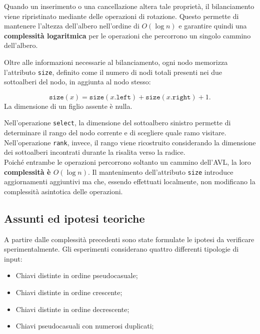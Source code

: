 \documentclass[a4paper,11pt]{article}
\begin{document}
Quando un inserimento o una cancellazione altera tale proprietà, il bilanciamento viene ripristinato mediante delle operazioni di rotazione. Questo permette di mantenere l'altezza dell'albero nell'ordine di \textbf{$O(\log n)$} e garantire quindi una \textbf{complessità logaritmica} per le operazioni che percorrono un singolo cammino dell'albero.

Oltre alle informazioni necessarie al bilanciamento, ogni nodo memorizza l'attributo \texttt{size}, definito come il numero di nodi totali presenti nei due sottoalberi del nodo, in aggiunta al nodo stesso:

\[
    \texttt{size}(x)
    =
    \texttt{size}(x.\texttt{left})
    +
    \texttt{size}(x.\texttt{right})
    + 1.
\]
La dimensione di un figlio assente è nulla.  

Nell'operazione \texttt{select}, la dimensione del sottoalbero sinistro permette di determinare il rango del nodo corrente e di scegliere quale ramo visitare. Nell'operazione \texttt{rank}, invece, il rango viene ricostruito considerando la dimensione dei sottoalberi incontrati durante la risalita verso la radice.\\
Poiché entrambe le operazioni percorrono soltanto un cammino dell'AVL, la loro \textbf{complessità è {$O(\log n)$}}. Il mantenimento dell'attributo \texttt{size} introduce aggiornamenti aggiuntivi ma che, essendo effettuati localmente, non modificano la complessità asintotica delle operazioni.


\subsection{Assunti ed ipotesi teoriche}
A partire dalle complessità precedenti sono state formulate le ipotesi da verificare sperimentalmente. Gli esperimenti considerano quattro differenti tipologie di input: 
\begin{itemize}
    \item Chiavi distinte in ordine pseudocasuale;
    
    \item Chiavi distinte in ordine crescente;
    
    \item Chiavi distinte in ordine decrescente;
    
    \item Chiavi pseudocasuali con numerosi duplicati;
\end{itemize}
\end{document}

